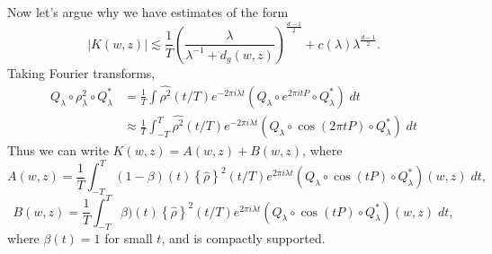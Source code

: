 \documentclass{article}
\theoremstyle{plain}
\theoremstyle{remark}
\theoremstyle{definition}
\begin{document}
Now let's argue why we have estimates of the form
%
\[ |K(w,z)| \lesssim \frac{1}{T} \left( \frac{\lambda}{\lambda^{-1} + d_g(w,z)} \right)^{\frac{d-1}{2}} + c(\lambda) \lambda^{\frac{d-1}{2}}. \]
%
Taking Fourier transforms,
%
\begin{align*}
    Q_\lambda \circ \rho_\lambda^2 \circ Q_\lambda^* &= \frac{1}{T} \int \widehat{\rho^2}(t/T) e^{-2 \pi i \lambda t} (Q_\lambda \circ e^{2 \pi i t P} \circ Q_\lambda^*)\; dt\\
    &\approx \frac{1}{T} \int_{-T}^T \widehat{\rho^2}(t/T) e^{-2 \pi i \lambda t} (Q_\lambda \circ \cos(2 \pi t P) \circ Q_\lambda^*)\; dt
\end{align*}
%
Thus we can write $K(w,z) = A(w,z) + B(w,z)$, where
%
\[ A(w,z) = \frac{1}{T} \int_{-T}^T (1 - \beta)(t) \left\{ \widehat{\rho} \right\}^2(t/T) e^{2 \pi i \lambda t} (Q_\lambda \circ \cos(t P) \circ Q_\lambda^*)(w,z)\; dt, \]
%
\[ B(w,z) = \frac{1}{T} \int_{-T}^T \beta)(t) \left\{ \widehat{\rho} \right\}^2(t/T) e^{2 \pi i \lambda t} (Q_\lambda \circ \cos(t P) \circ Q_\lambda^*)(w,z)\; dt, \]
%
where $\beta(t) = 1$ for small $t$, and is compactly supported.
\end{document}
